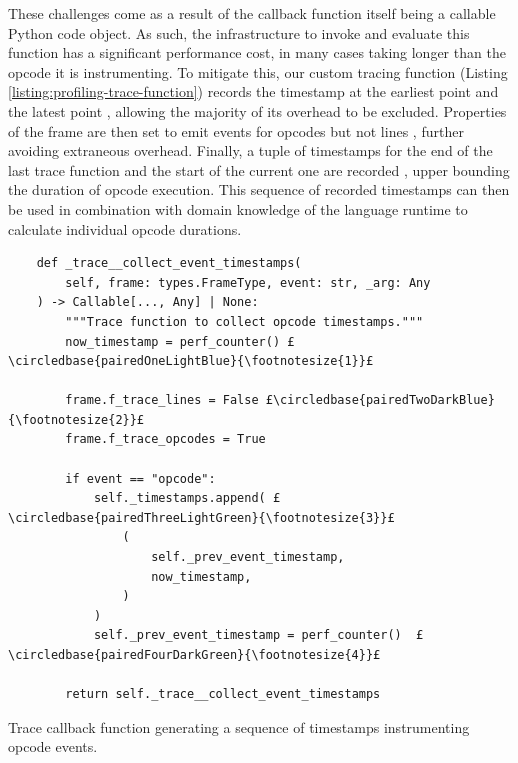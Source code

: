 These challenges come as a result of the callback function itself being a callable Python code object.
As such, the infrastructure to invoke and evaluate this function has a significant performance cost, in many cases taking longer than the opcode it is instrumenting. To mitigate this, our custom tracing function (Listing \ref{listing:profiling-trace-function}) records the timestamp at the earliest point  and the latest point , allowing the majority of its overhead to be excluded. Properties of the frame are then set to emit events for opcodes but not lines , further avoiding extraneous overhead. Finally, a tuple of timestamps for the end of the last trace function and the start of the current one are recorded , upper bounding the duration of opcode execution.
This sequence of recorded timestamps can then be used in combination with domain knowledge of the language runtime to calculate individual opcode durations.

\begin{listing}[H]
    \centering
    \begin{verbatim}
    def _trace__collect_event_timestamps(
        self, frame: types.FrameType, event: str, _arg: Any
    ) -> Callable[..., Any] | None:
        """Trace function to collect opcode timestamps."""
        now_timestamp = perf_counter() £\circledbase{pairedOneLightBlue}{\footnotesize{1}}£

        frame.f_trace_lines = False £\circledbase{pairedTwoDarkBlue}{\footnotesize{2}}£
        frame.f_trace_opcodes = True

        if event == "opcode":
            self._timestamps.append( £\circledbase{pairedThreeLightGreen}{\footnotesize{3}}£
                (
                    self._prev_event_timestamp,
                    now_timestamp,
                )
            )
            self._prev_event_timestamp = perf_counter()  £\circledbase{pairedFourDarkGreen}{\footnotesize{4}}£

        return self._trace__collect_event_timestamps
    \end{verbatim}
    \vspace{1em}
    \caption{Trace callback function generating a sequence of timestamps instrumenting opcode events.}
    \label{listing:profiling-trace-function}
\end{listing}


